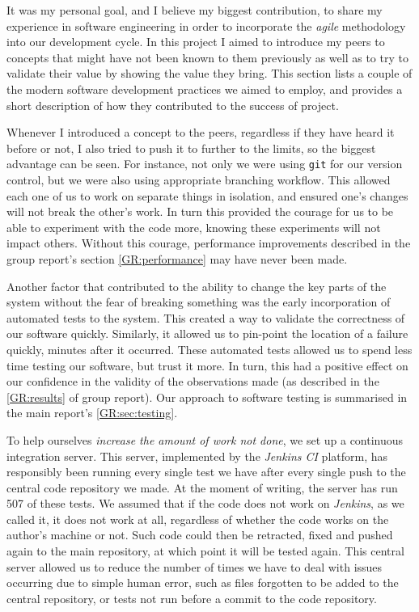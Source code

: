 It was my personal goal, and I believe my biggest contribution, to share my experience in software engineering in order to incorporate the \emph{agile} methodology into our development cycle. 
In this project I aimed to introduce my peers to concepts that might have not been known to them previously as well as to try to validate their value by showing the value they bring. 
This section lists a couple of the modern software development practices we aimed to employ, and provides a short description of how they contributed to the success of \means{} project.

Whenever I introduced a concept to the peers, regardless if they have heard it before or not, I also tried to push it to further to the limits, so the biggest advantage can be seen. 
For instance, not only we were using \verb"git"\cite{git} for our version control, but we were also using appropriate branching workflow. 
This allowed each one of us to work on separate things in isolation, and ensured one's changes will not break the other's work. 
In turn this provided the courage for us to be able to experiment with the code more, knowing these experiments will not impact others.
Without this courage, performance improvements described in the group report's section \autoref*{GR:performance} may have never been made.

Another factor that contributed to the ability to change the key parts of the system without the fear of breaking something was the early incorporation of automated tests to the system. 
This created a way to validate the correctness of our software quickly.
Similarly, it allowed us to pin-point the location of a failure quickly, minutes after it occurred.
These automated tests allowed us to spend less time testing our software, but trust it more.
In turn, this had a positive effect on our confidence in the validity of the observations made (as described in the \autoref*{GR:results} of group report). Our approach to software testing is summarised in the main report's \autoref*{GR:sec:testing}.

To help ourselves \emph{increase the amount of work not done}, we set up a continuous integration server.
This server, implemented by the \emph{Jenkins CI} platform\cite{_jenkins_????}, has responsibly been running every single test we have after every single push to the central code repository we made. At the moment of writing, the server has run 507 of these tests.
We assumed that if the code does not work on \emph{Jenkins}, as we called it, it does not work at all, regardless of whether the code works on the author's machine or not. 
Such code could then be retracted, fixed and pushed again to the main repository, at which point it will be tested again. 
This central server allowed us to reduce the number of times we have to deal with issues occurring due to simple human error, such as files forgotten to be added to the central repository, or tests not run before a commit to the code repository.

